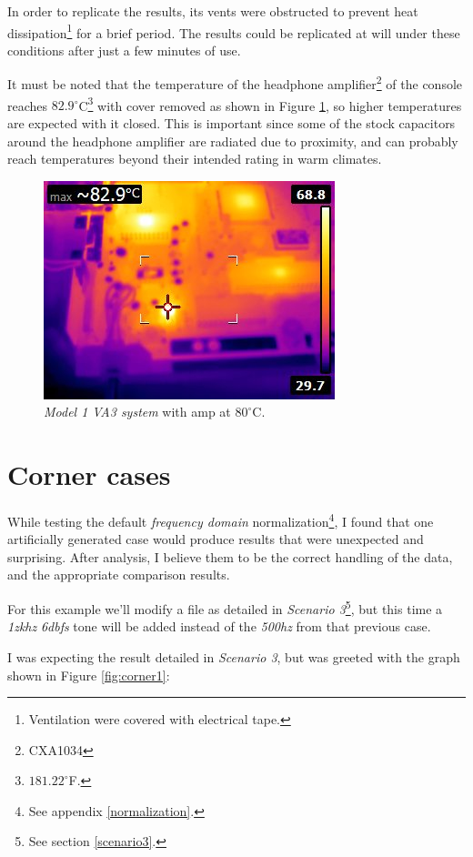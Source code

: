 \documentclass[10pt,a4paper]{report}
\newcommand{\hz}[1]{\textit{#1\acrshort{hz}}}
\newcommand{\khz}[1]{\textit{#1\acrshort{khz}}}
\newcommand{\db}[1]{\textit{#1\acrshort{dbfs}}}
\begin{document}
\begin{appendices}
In order to replicate the results, its vents were obstructed to prevent heat dissipation\footnote{Ventilation were covered with electrical tape.} for a brief period. The results could be replicated at will under these conditions after just a few minutes of use.

It must be noted that the temperature of the headphone amplifier\footnote{CXA1034} of the console reaches $82.9^\circ$C\footnote{$181.22^\circ$F.} with cover removed as shown in Figure \ref{fig:heathigh}, so higher temperatures are expected with it closed. This is important since some of the stock capacitors around the headphone amplifier are radiated due to proximity, and can probably reach temperatures beyond their intended rating in warm climates.

\begin{figure}[H]
	\centering
	\includegraphics[width=0.4\linewidth]{images/heat/2-hot.jpg}
	\caption[Hot Console]{\textit{Model 1 VA3 system} with amp at $80^\circ$C.}
	\label{fig:heathigh}
\end{figure}

\chapter{Corner cases}
\label{cornercase}

While testing the default\textit{ frequency domain} normalization\footnote{See appendix \ref{normalization}.}, I found that one artificially generated case would produce results that were unexpected and surprising. After analysis, I believe them to be the correct handling of the data, and the appropriate comparison results.

For this example we'll modify a file as detailed in \textit{Scenario 3}\footnote{See section \ref{scenario3}.}, but this time a \khz{1z} \db{6} tone will be added instead of the \hz{500} from that previous case.

I was expecting the result detailed in \textit{Scenario 3}, but was greeted with the graph shown in Figure \ref{fig:corner1}:


\end{appendices}
\end{document}
